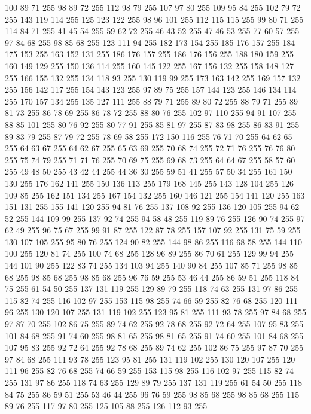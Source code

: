 100 89 71 255 98 89 72 255 112 98 79 255 107 97 80 255 109 95 84 255 102 79 72 255 143 119 114 255 125 123 122 255 98 96 101 255 112 115 115 255 99 80 71 255 114 84 71 255 41 45 54 255 59 62 72 255 46 43 52 255 47 46 53 255 77 60 57 255 97 84 68 255 98 85 68 255 123 111 94 255 182 173 154 255 185 176 157 255 184 175 153 255 163 152 131 255 186 176 157 255 186 176 156 255 188 180 159 255 160 149 129 255 150 136 114 255 160 145 122 255 167 156 132 255 158 148 127 255 166 155 132 255 134 118 93 255 130 119 99 255 173 163 142 255 169 157 132 255 156 142 117 255 154 143 123 255 97 89 75 255 157 144 123 255 146 134 114 255 170 157 134 255 135 127 111 255 88 79 71 255 89 80 72 255 88 79 71 255 89 81 73 255 86 78 69 255 86 78 72 255 88 80 76 255 102 97 110 255 94 91 107 255 88 85 101 255 80 76 92 255 80 77 91 255 85 81 97 255 87 83 98 255 86 83 91 255 89 83 79 255 87 79 72 255 78 69 58 255 172 150 116 255 76 71 70 255
64 62 65 255 64 63 67 255 64 62 67 255 65 63 69 255 70 68 74 255 72 71 76 255 76 76 80 255 75 74 79 255 71 71 76 255 70 69 75 255 69 68 73 255 64 64 67 255 58 57 60 255 49 48 50 255 43 42 44 255 44 36 30 255 59 51 41 255 57 50 34 255 161 150 130 255 176 162 141 255 150 136 113 255 179 168 145 255 143 128 104 255 126 109 85 255 162 151 134 255 167 154 132 255 160 146 121 255 154 141 120 255 163 151 131 255 155 141 120 255 94 81 76 255 137 108 92 255 136 120 105 255 94 62 52 255 144 109 99 255 137 92 74 255 94 58 48 255 119 89 76 255 126 90 74 255 97 62 49 255 96 75 67 255 99 91 87 255 122 87 78 255 157 107 92 255 131 75 59 255 130 107 105 255 95 80 76 255 124 90 82 255 144 98 86 255 116 68 58 255 144 110 100 255 120 81 74 255 100 74 68 255 128 96 89 255 86 70 61 255 129 99 94 255 144 101 90 255 122 83 74 255 134 103 94 255 140 90 84 255 107 85 71 255 98 85 68 255 98 85 68 255 98 85 68 255
96 76 59 255 53 46 44 255 86 59 51 255 118 84 75 255 61 54 50 255 137 131 119 255 129 89 79 255 118 74 63 255 131 97 86 255 115 82 74 255 116 102 97 255 153 115 98 255 74 66 59 255 82 76 68 255 120 111 96 255 130 120 107 255 131 119 102 255 123 95 81 255 111 93 78 255 97 84 68 255 97 87 70 255 102 86 75 255 89 74 62 255 92 78 68 255 92 72 64 255 107 95 83 255 101 84 68 255 91 74 60 255 98 81 65 255 98 81 65 255 91 74 60 255 101 84 68 255 107 95 83 255 92 72 64 255 92 78 68 255 89 74 62 255 102 86 75 255 97 87 70 255 97 84 68 255 111 93 78 255 123 95 81 255 131 119 102 255 130 120 107 255 120 111 96 255 82 76 68 255 74 66 59 255 153 115 98 255 116 102 97 255 115 82 74 255 131 97 86 255 118 74 63 255 129 89 79 255 137 131 119 255 61 54 50 255 118 84 75 255 86 59 51 255 53 46 44 255 96 76 59 255 98 85 68 255 98 85 68 255 115 89 76 255 117 97 80 255 125 105 88 255 126 112 93 255
